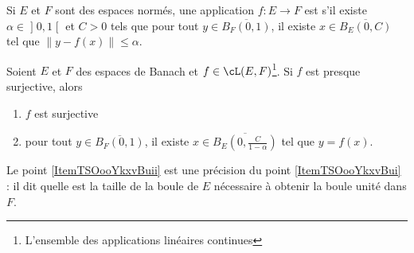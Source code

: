 \begin{definition}
Si \( E\) et \( F\) sont des espaces normés, une application \( f\colon E\to F\) est  s'il existe \( \alpha\in\mathopen] 0 , 1 \mathclose[\) et \( C>0\) tels que pour tout \( y\in \overline{ B_F(0,1) }\), il existe \( x\in\overline{ B_E(0,C) }\) tel que \( \| y-f(x) \|\leq \alpha\).
\end{definition}

\begin{lemma}   \label{LemBQLooRXhJzK}
    Soient \( E\) et \( F\) des espaces de Banach et \( f\in\cL(E,F)\)\footnote{L'ensemble des applications linéaires continues}. Si \( f\) est presque surjective, alors
    \begin{enumerate}
        \item   \label{ItemTSOooYkxvBui}
            \( f\) est surjective
        \item\label{ItemTSOooYkxvBuii}
            pour tout \( y\in \overline{ B_F(0,1) }\), il existe \( x\in\overline{ B_E(0,\frac{ C }{ 1-\alpha }) }\) tel que \( y=f(x)\).
    \end{enumerate}
\end{lemma}
Le point \ref{ItemTSOooYkxvBuii} est une précision du point \ref{ItemTSOooYkxvBui} : il dit quelle est la taille de la boule de \( E\) nécessaire à obtenir la boule unité dans \( F\).

